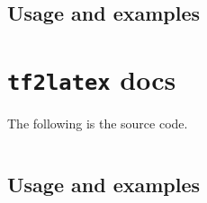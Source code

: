 \inputminted{matlab}{../rico/zero.m}

\hypertarget{usage-and-examples-3}{%
\subsection{Usage and examples}\label{usage-and-examples-3}}

\hypertarget{tf2latex-docs}{%
\section{\texorpdfstring{\texttt{tf2latex}
docs}{ docs}}\label{tf2latex-docs}}

The following is the source code.

\inputminted{matlab}{../rico/tf2latex.m}

\hypertarget{usage-and-examples-4}{%
\subsection{Usage and examples}\label{usage-and-examples-4}}
